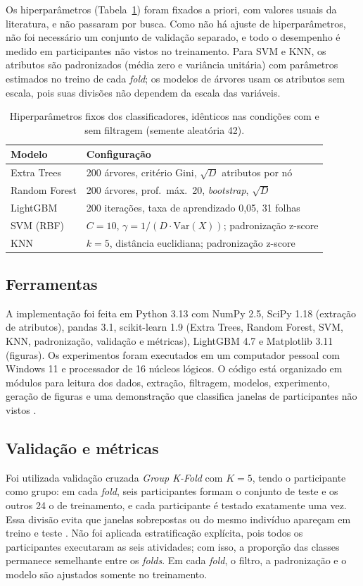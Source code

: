 \documentclass[conference]{IEEEtran}
\begin{document}
Os hiperparâmetros (Tabela~\ref{tab:hiper}) foram fixados a priori, com valores usuais da literatura, e não passaram por busca. Como não há ajuste de hiperparâmetros, não foi necessário um conjunto de validação separado, e todo o desempenho é medido em participantes não vistos no treinamento. Para SVM e KNN, os atributos são padronizados (média zero e variância unitária) com parâmetros estimados no treino de cada \textit{fold}; os modelos de árvores usam os atributos sem escala, pois suas divisões não dependem da escala das variáveis.

\begin{table}[!htb]
\centering
\caption{Hiperparâmetros fixos dos classificadores, idênticos nas condições com e sem filtragem (semente aleatória 42).}
\label{tab:hiper}
\footnotesize
\begin{tabular}{@{}p{}p{}@{}}
\toprule
Modelo & Configuração\\
\midrule
Extra Trees & 200 árvores, critério Gini, $\sqrt{D}$ atributos por nó\\
Random Forest & 200 árvores, prof.\ máx.\ 20, \textit{bootstrap}, $\sqrt{D}$\\
LightGBM & 200 iterações, taxa de aprendizado 0,05, 31 folhas\\
SVM (RBF) & $C=10$, $\gamma=1/(D\cdot\mathrm{Var}(X))$; padronização z-score\\
KNN & $k=5$, distância euclidiana; padronização z-score\\
\bottomrule
\end{tabular}
\end{table}

\subsection{Ferramentas}
A implementação foi feita em Python 3.13 com NumPy 2.5, SciPy 1.18 (extração de atributos), pandas 3.1, scikit-learn 1.9 \cite{Pedregosa2011} (Extra Trees, Random Forest, SVM, KNN, padronização, validação e métricas), LightGBM 4.7 e Matplotlib 3.11 (figuras). Os experimentos foram executados em um computador pessoal com Windows 11 e processador de 16 núcleos lógicos. O código está organizado em módulos para leitura dos dados, extração, filtragem, modelos, experimento, geração de figuras e uma demonstração que classifica janelas de participantes não vistos \cite{Repositorio}.

\subsection{Validação e métricas}
Foi utilizada validação cruzada \textit{Group K-Fold} com $K=5$, tendo o participante como grupo: em cada \textit{fold}, seis participantes formam o conjunto de teste e os outros 24 o de treinamento, e cada participante é testado exatamente uma vez. Essa divisão evita que janelas sobrepostas ou do mesmo indivíduo apareçam em treino e teste \cite{Hammerla2015}. Não foi aplicada estratificação explícita, pois todos os participantes executaram as seis atividades; com isso, a proporção das classes permanece semelhante entre os \textit{folds}. Em cada \textit{fold}, o filtro, a padronização e o modelo são ajustados somente no treinamento.
\end{document}
